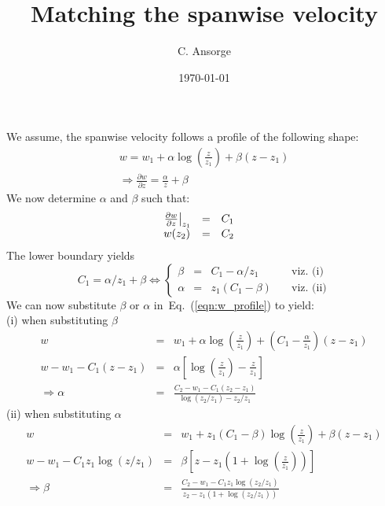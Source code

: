 \documentclass[a4paper,12pt]{article}
\title{Matching the spanwise velocity}
\author{C. Ansorge}
\date{\today}
\newcommand{\p}{\partial}
\begin{document}
We assume, the spanwise velocity follows a profile of the following shape:
\begin{eqnarray}
  w = w_1 + \alpha \log \left(\frac{z}{z_1}\right) + \beta (z-z_1) \label{eqn:w_profile}\\
  \Rightarrow \frac{\p w}{\p z} = \frac{\alpha}{z} + \beta 
\end{eqnarray}
We now determine $\alpha$ and $\beta$ such that:
\begin{equation}
  \begin{array}{c c c c}
    \left.\frac{\p w}{\p z}\right|_{z_1}&=& C_1 &\\ 
    w(z_2) &=& C_2 & 
  \end{array} 
\end{equation}
The lower boundary yields
\begin{equation}
  C_1 = \alpha/z_{1} + \beta \Leftrightarrow
  \left\{\begin{array}{cccl}
    \beta& =& C_1-\alpha/z_{1} & \quad \text{viz.\ (i)} \\
    \alpha&=&z_{1}(C_1-\beta) & \quad \text{viz.\ (ii)} 
  \end{array}\right.
\end{equation}
We can now substitute $\beta$ or $\alpha$ in~Eq.~(\ref{eqn:w_profile}) to yield:\\
(i) when substituting $\beta$ 
\begin{eqnarray}
  w &=& w_1 + \alpha\log\left(\frac{z}{z_1}\right) + \left(C_1-\frac{\alpha}{z_1}\right)(z-z_1)  \\
  w-w_1-C_1(z-z_1) &=& \alpha\left[\log\left(\frac{z}{z_1}\right) - \frac{z}{z_1}\right]\\
  \Rightarrow\alpha &=&   \frac{C_2-w_1-C_1(z_2-z_1)}{\log(z_2/z_1) - z_2/z_1}
\end{eqnarray}
(ii) when substituting $\alpha$
\begin{eqnarray} 
  w &=& w_1 + z_1(C_1-\beta) \log \left(\frac{z}{z_1}\right) + \beta (z-z_1) \\
  w-w_1-C_1z_1\log(z/z_1) &=& \beta\left[ z-z_1 \left(1+ \log\left(\frac{z}{z_1}\right)\right)\right] \\
  \Rightarrow\beta&=& \frac{C_2-w_1-C_1z_1\log(z_2/z_1)}{ z_2-z_1 (1+ \log(z_2/z_1))}
\end{eqnarray} 
\end{document}
